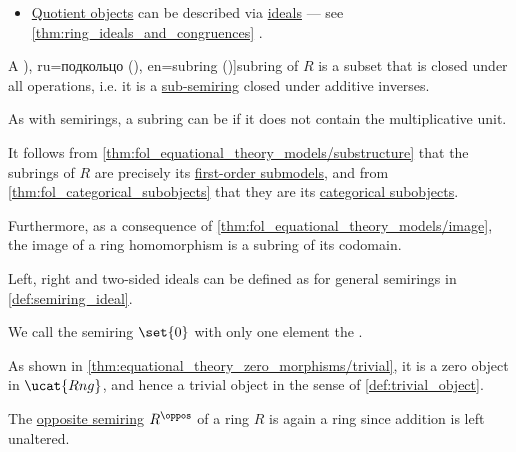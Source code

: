 \begin{definition}
\begin{thmenum}
\begin{itemize}
      In particular, \cref{thm:concrete_category_function_invertibility/injective} implies that a ring homomorphism is a \hyperref[def:morphism_invertibility/left_cancellative]{monomorphism} if and only if it is \hyperref[def:function_invertibility/injective]{injective}.

      \item \hyperref[def:categorical_quotient_object]{Quotient objects} can be described via \hyperref[def:ring/ideal]{ideals} --- see \cref{thm:ring_ideals_and_congruences} .
    \end{itemize}

    \mimprovised A \term[bg=подпръстен (\cite[def. V.3]{ГеновМиховскиМоллов1991Алгебра}), ru=подкольцо (\cite[def. 1.3.3]{Винберг2014КурсАлгебры}), en=subring (\cite[87]{Jacobson1985BasicAlgebraI})]{subring} of \( R \) is a subset that is closed under all operations, i.e. it is a \hyperref[def:semiring/subobject]{sub-semiring} closed under additive inverses.

    As with semirings, a subring can be  if it does not contain the multiplicative unit.

    It follows from \cref{thm:fol_equational_theory_models/substructure} that the subrings of \( R \) are precisely its \hyperref[def:fol_substructure/submodel]{first-order submodels}, and from \cref{thm:fol_categorical_subobjects} that they are its \hyperref[def:categorical_subobject]{categorical subobjects}.

    Furthermore, as a consequence of \cref{thm:fol_equational_theory_models/image}, the image of a ring homomorphism is a subring of its codomain.

     Left, right and two-sided ideals can be defined as for general semirings in \cref{def:semiring_ideal}.

     We call the semiring \( \set{ 0 } \) with only one element the .

    As shown in \cref{thm:equational_theory_zero_morphisms/trivial}, it is a zero object in \( \ucat{Rng} \), and hence a trivial object in the sense of \cref{def:trivial_object}.

     The \hyperref[def:semiring/opposite]{opposite semiring} \( R^{\oppos} \) of a ring \( R \) is again a ring since addition is left unaltered.


\end{thmenum}
\end{definition}
